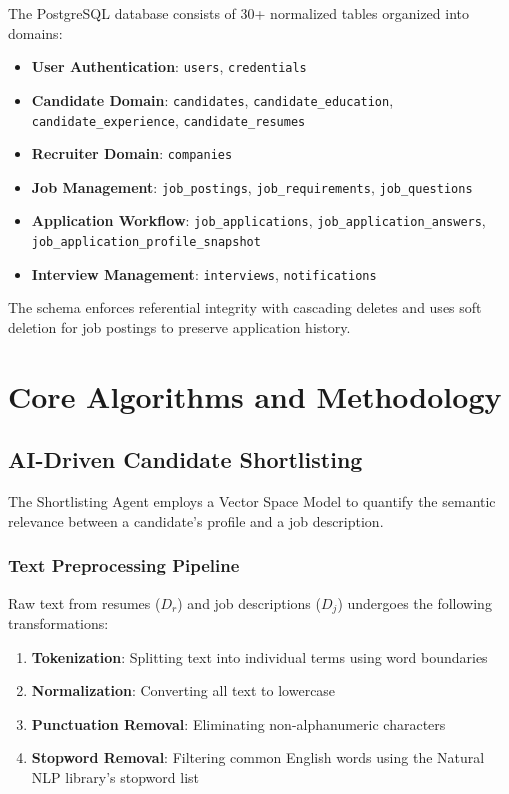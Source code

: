 \documentclass[conference]{IEEEtran}
\begin{document}
The PostgreSQL database consists of 30+ normalized tables organized into domains:

\begin{itemize}
    \item \textbf{User Authentication}: \texttt{users}, \texttt{credentials}
    \item \textbf{Candidate Domain}: \texttt{candidates}, \texttt{candidate\_education}, \texttt{candidate\_experience}, \texttt{candidate\_resumes}
    \item \textbf{Recruiter Domain}: \texttt{companies}
    \item \textbf{Job Management}: \texttt{job\_postings}, \texttt{job\_requirements}, \texttt{job\_questions}
    \item \textbf{Application Workflow}: \texttt{job\_applications}, \texttt{job\_application\_answers}, \texttt{job\_application\_profile\_snapshot}
    \item \textbf{Interview Management}: \texttt{interviews}, \texttt{notifications}
\end{itemize}

The schema enforces referential integrity with cascading deletes and uses soft deletion for job postings to preserve application history.

\section{Core Algorithms and Methodology}

\subsection{AI-Driven Candidate Shortlisting}

The Shortlisting Agent employs a Vector Space Model to quantify the semantic relevance between a candidate's profile and a job description.

\subsubsection{Text Preprocessing Pipeline}

Raw text from resumes ($D_r$) and job descriptions ($D_j$) undergoes the following transformations:

\begin{enumerate}
    \item \textbf{Tokenization}: Splitting text into individual terms using word boundaries
    \item \textbf{Normalization}: Converting all text to lowercase
    \item \textbf{Punctuation Removal}: Eliminating non-alphanumeric characters
    \item \textbf{Stopword Removal}: Filtering common English words using the Natural NLP library's stopword list
\end{enumerate}
\end{document}
